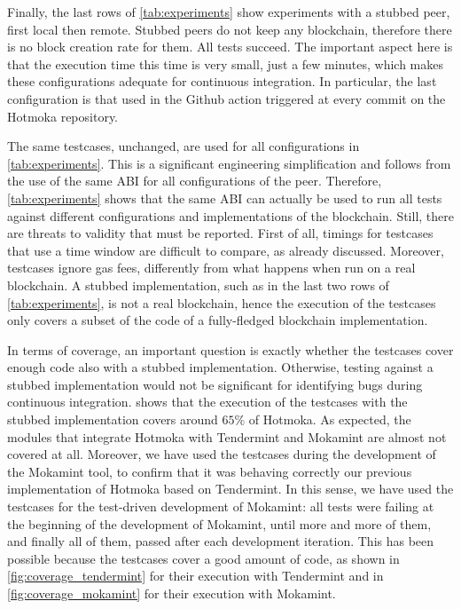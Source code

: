 Finally, the last rows of \cref{tab:experiments} show experiments with a stubbed
peer, first local then remote. Stubbed peers do not keep any blockchain, therefore
there is no block creation rate for them. All tests succeed. The important aspect here is
that the execution time this time is very small, just a few minutes, which makes
these configurations adequate for continuous integration. In particular, the last configuration
is that used in the Github action triggered at every commit on the Hotmoka repository.

The same testcases, unchanged, are used for all
configurations in \cref{tab:experiments}. This is a significant engineering simplification
and follows from the use of the same ABI for all configurations of the peer.
Therefore, \cref{tab:experiments} shows that the same ABI can actually be used to run all tests
against different configurations and implementations of the blockchain. Still, there are threats to validity
that must be reported. First of all, timings for testcases that use a time window are difficult to compare,
as already discussed.
Moreover, testcases ignore gas fees, differently from what happens when run on a real blockchain.
A stubbed
implementation, such as in the last two rows of \cref{tab:experiments}, is not
a real blockchain, hence the execution of the testcases only covers a subset of
the code of a fully-fledged blockchain implementation.

In terms of coverage, an important question is exactly whether
the testcases cover enough code also with a stubbed implementation.
Otherwise, testing against a stubbed implementation would not be significant for identifying bugs
during continuous integration.
 shows that the execution of the testcases with the stubbed
implementation covers around $65\%$ of Hotmoka. As expected, the modules that integrate Hotmoka with
Tendermint and Mokamint are almost not covered at all.
Moreover, we have used the testcases during the development of the Mokamint tool, to confirm that
it was behaving correctly \wrt our previous implementation of Hotmoka
based on Tendermint. In this sense, we have
used the testcases for the test-driven development of Mokamint:
all tests were failing at the beginning of the development of
Mokamint, until more and more of them, and finally all of them,
passed after each development iteration. This has been possible
because the testcases cover a good amount of code, as shown in \cref{fig:coverage_tendermint} for
their execution with Tendermint and in \cref{fig:coverage_mokamint} for their execution with Mokamint.

